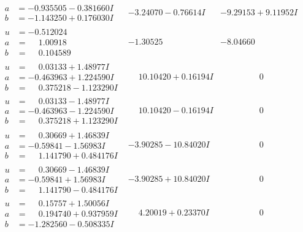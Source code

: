 \documentclass[1p]{elsarticle_modified}
\theoremstyle{definition}
\begin{document}
$$\begin{array}{c|c|c}
\begin{aligned}
a &= -0.935505 - 0.381660 I \\
b &= -1.143250 + 0.176030 I\end{aligned}
 & -3.24070 - 0.76614 I & -9.29153 + 9.11952 I \\ \hline\begin{aligned}
u &= -0.512024\phantom{ +0.000000I} \\
a &= \phantom{-}1.00918\phantom{ +0.000000I} \\
b &= \phantom{-}0.104589\phantom{ +0.000000I}\end{aligned}
 & -1.30525\phantom{ +0.000000I} & -8.04660\phantom{ +0.000000I} \\ \hline\begin{aligned}
u &= \phantom{-}0.03133 + 1.48977 I \\
a &= -0.463963 + 1.224590 I \\
b &= \phantom{-}0.375218 - 1.123290 I\end{aligned}
 & \phantom{-}10.10420 + 0.16194 I & \phantom{-0.000000 } 0 \\ \hline\begin{aligned}
u &= \phantom{-}0.03133 - 1.48977 I \\
a &= -0.463963 - 1.224590 I \\
b &= \phantom{-}0.375218 + 1.123290 I\end{aligned}
 & \phantom{-}10.10420 - 0.16194 I & \phantom{-0.000000 } 0 \\ \hline\begin{aligned}
u &= \phantom{-}0.30669 + 1.46839 I \\
a &= -0.59841 - 1.56983 I \\
b &= \phantom{-}1.141790 + 0.484176 I\end{aligned}
 & -3.90285 - 10.84020 I & \phantom{-0.000000 } 0 \\ \hline\begin{aligned}
u &= \phantom{-}0.30669 - 1.46839 I \\
a &= -0.59841 + 1.56983 I \\
b &= \phantom{-}1.141790 - 0.484176 I\end{aligned}
 & -3.90285 + 10.84020 I & \phantom{-0.000000 } 0 \\ \hline\begin{aligned}
u &= \phantom{-}0.15757 + 1.50056 I \\
a &= \phantom{-}0.194740 + 0.937959 I \\
b &= -1.282560 - 0.508335 I\end{aligned}
 & \phantom{-}4.20019 + 0.23370 I & \phantom{-0.000000 } 0 \\ \hline\begin{aligned}

\end{aligned}
\end{array}$$
\end{document}
